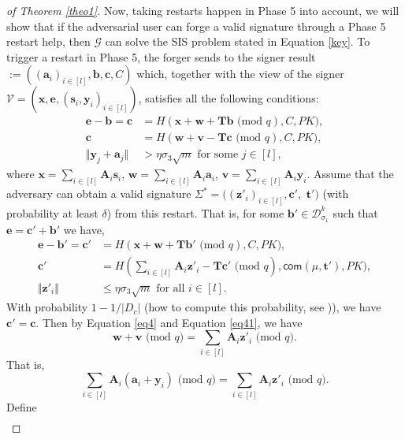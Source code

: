 \documentclass[runningheads]{llncs}
\begin{document}
\begin{proof}[of Theorem \ref{theo1}]
	Now, taking restarts happen in Phase 5 into account, we will show that if the adversarial user can forge a valid signature through a Phase 5 restart help, then $\mathcal{G}$ can solve the \textsf{SIS} problem stated in Equation \eqref{key}.  To trigger a restart in Phase 5, the forger sends to the signer \textsf{result}$:=((\mathbf{a}_i)_{i\in[l]}, \mathbf{b}, \mathbf{c}, C)$ which, together with the view of the signer $\mathcal{V}=(\mathbf{x},\mathbf{e}, (\mathbf{s}_i, \mathbf{y}_i)_{i \in [l]})$, satisfies all the following conditions:
	\begin{align}
	\mathbf{e}-\mathbf{b}=\mathbf{c}&=H(\mathbf{x}+\mathbf{w}+\mathbf{T}\mathbf{b} \text{ (mod } q), C, PK)\label{eq3},\\
	\mathbf{c}&=H(\mathbf{w}+\mathbf{v}-\mathbf{T}\mathbf{c} \text{ (mod } q), C, PK) \label{eq4},\\
	\Vert \mathbf{y}_{j}+\mathbf{a}_{j} \Vert &> \eta \sigma_3 \sqrt{m} \text{ for some } j  \in [l] \label{eq5},
	\end{align}
	where $\mathbf{x}=\sum_{i \in [l]}\mathbf{A}_i\mathbf{s}_i$, $\mathbf{w}=\sum_{i \in [l]}\mathbf{A}_i\mathbf{a}_i$, $\mathbf{v}=\sum_{i \in [l]}\mathbf{A}_i\mathbf{y}_i$.
	Assume that the adversary can obtain a valid signature $ \Sigma^*=((\mathbf{z}'_i)_{i \in [l]}, \mathbf{c}',$ $ \mathbf{t}')$ (with probability at least $\delta$) from this restart. That is, for some $\mathbf{b}' \in \mathcal{D}_{\sigma_1}^k$ such that $\mathbf{e}=\mathbf{c}'+\mathbf{b}'$ we have,
	\begin{align}
	\mathbf{e}-\mathbf{b}'=\mathbf{c}'&=H(\mathbf{x}+\mathbf{w}+\mathbf{T}\mathbf{b}' \text{ (mod } q), C, PK)\label{eq31},\\
	\mathbf{c}'&=H(\sum_{i \in [l]}\mathbf{A}_i\mathbf{z}'_i -\mathbf{T}\mathbf{c}'\text{ (mod } q), \mathsf{com}(\mu, \mathbf{t}'), PK) \label{eq41},\\
	\Vert \mathbf{z}'_i\Vert &\leq \eta\sigma_3\sqrt{m} \text{ for all } i  \in [l] \label{eq51}.
	\end{align}
	With probability $1-1/|D_c|$ (how to compute this probability, see \cite[Subsection 4.6.1 in Chapter 4]{Guo2018})), we have  $\mathbf{c}'=\mathbf{c}$. Then by Equation \eqref{eq4} and Equation \eqref{eq41}, we have 
	$$\mathbf{w}+\mathbf{v} \text{ (mod } q)=\sum_{i \in [l]}\mathbf{A}_i\mathbf{z}'_{i} \text{ (mod } q).$$
	That is,
	$$\sum_{i \in [l]}\mathbf{A}_i ( \mathbf{a}_i+\mathbf{y}_i) \text{ (mod } q)=\sum_{i \in [l]}\mathbf{A}_i\mathbf{z}'_{i} \text{ (mod } q).$$
	Define
	\begin{align*}

\end{align*}
\end{proof}
\end{document}
